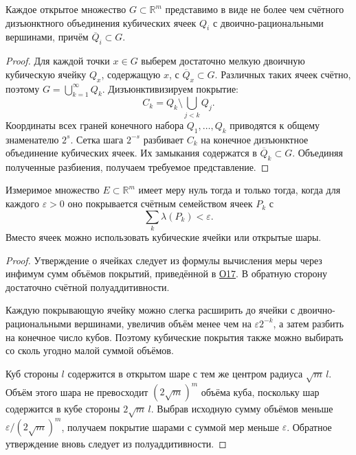 \label{ticket:22}

\begin{lemma}
Каждое открытое множество $G\subset\mathbb R^m$ представимо в виде не более чем счётного дизъюнктного объединения кубических ячеек $Q_i$ с двоично-рациональными вершинами, причём $\overline Q_i\subset G$.
\end{lemma}

\begin{proof}
Для каждой точки $x\in G$ выберем достаточно мелкую двоичную кубическую ячейку $Q_x$, содержащую $x$, с $\overline Q_x\subset G$.
Различных таких ячеек счётно, поэтому $G=\bigcup_{k=1}^{\infty}Q_k$.
Дизъюнктивизируем покрытие:
\[
  C_k=Q_k\setminus\bigcup_{j<k}Q_j.
\]
Координаты всех граней конечного набора $Q_1,\ldots,Q_k$ приводятся к общему знаменателю $2^s$.
Сетка шага $2^{-s}$ разбивает $C_k$ на конечное дизъюнктное объединение кубических ячеек.
Их замыкания содержатся в $\overline Q_k\subset G$.
Объединяя полученные разбиения, получаем требуемое представление.
\end{proof}

\begin{lemma}
Измеримое множество $E\subset\mathbb R^m$ имеет меру нуль тогда и только тогда, когда для каждого $\varepsilon>0$ оно покрывается счётным семейством ячеек $P_k$ с
\[
  \sum_k\lambda(P_k)<\varepsilon.
\]
Вместо ячеек можно использовать кубические ячейки или открытые шары.
\end{lemma}

\begin{proof}
Утверждение о ячейках следует из формулы вычисления меры через инфимум сумм объёмов покрытий, приведённой в \hyperref[definition:17]{О17}.
В обратную сторону достаточно счётной полуаддитивности.

Каждую покрывающую ячейку можно слегка расширить до ячейки с двоично-рациональными вершинами, увеличив объём менее чем на $\varepsilon2^{-k}$, а затем разбить на конечное число кубов.
Поэтому кубические покрытия также можно выбирать со сколь угодно малой суммой объёмов.

Куб стороны $l$ содержится в открытом шаре с тем же центром радиуса $\sqrt m\,l$.
Объём этого шара не превосходит $(2\sqrt m)^m$ объёма куба, поскольку шар содержится в кубе стороны $2\sqrt m\,l$.
Выбрав исходную сумму объёмов меньше $\varepsilon/(2\sqrt m)^m$, получаем покрытие шарами с суммой мер меньше $\varepsilon$.
Обратное утверждение вновь следует из полуаддитивности.
\end{proof}
